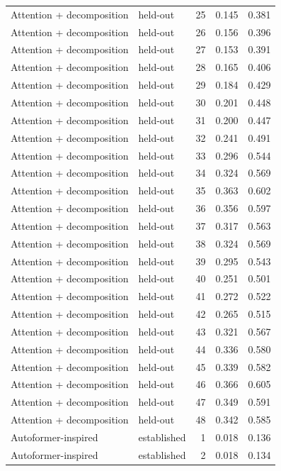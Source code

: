\begin{tabular}{llrrr}
Attention + decomposition & held-out & 25 & 0.145 & 0.381 \\
Attention + decomposition & held-out & 26 & 0.156 & 0.396 \\
Attention + decomposition & held-out & 27 & 0.153 & 0.391 \\
Attention + decomposition & held-out & 28 & 0.165 & 0.406 \\
Attention + decomposition & held-out & 29 & 0.184 & 0.429 \\
Attention + decomposition & held-out & 30 & 0.201 & 0.448 \\
Attention + decomposition & held-out & 31 & 0.200 & 0.447 \\
Attention + decomposition & held-out & 32 & 0.241 & 0.491 \\
Attention + decomposition & held-out & 33 & 0.296 & 0.544 \\
Attention + decomposition & held-out & 34 & 0.324 & 0.569 \\
Attention + decomposition & held-out & 35 & 0.363 & 0.602 \\
Attention + decomposition & held-out & 36 & 0.356 & 0.597 \\
Attention + decomposition & held-out & 37 & 0.317 & 0.563 \\
Attention + decomposition & held-out & 38 & 0.324 & 0.569 \\
Attention + decomposition & held-out & 39 & 0.295 & 0.543 \\
Attention + decomposition & held-out & 40 & 0.251 & 0.501 \\
Attention + decomposition & held-out & 41 & 0.272 & 0.522 \\
Attention + decomposition & held-out & 42 & 0.265 & 0.515 \\
Attention + decomposition & held-out & 43 & 0.321 & 0.567 \\
Attention + decomposition & held-out & 44 & 0.336 & 0.580 \\
Attention + decomposition & held-out & 45 & 0.339 & 0.582 \\
Attention + decomposition & held-out & 46 & 0.366 & 0.605 \\
Attention + decomposition & held-out & 47 & 0.349 & 0.591 \\
Attention + decomposition & held-out & 48 & 0.342 & 0.585 \\
Autoformer-inspired & established & 1 & 0.018 & 0.136 \\
Autoformer-inspired & established & 2 & 0.018 & 0.134 \\

\end{tabular}

